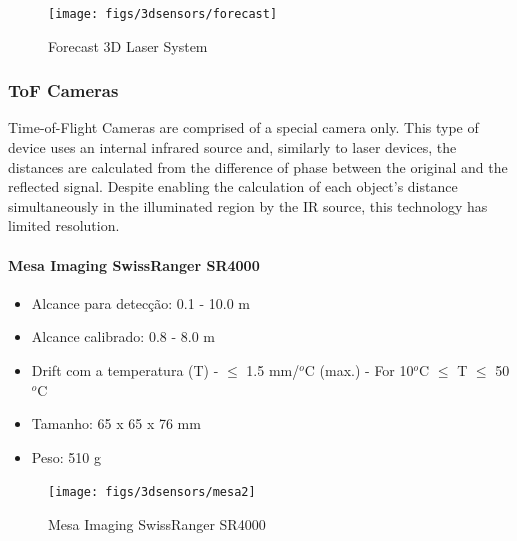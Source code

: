 \begin{figure}[h!]
   \centering
   \texttt{[image: figs/3dsensors/forecast]}
   \caption{Forecast 3D Laser System}
   \label{fig::forecast}
\end{figure}

\subsubsection{ToF Cameras}

Time-of-Flight Cameras are comprised of a special camera only. This type of
device uses an internal infrared source and, similarly to laser devices, the
distances are calculated from the difference of phase between the original and
the reflected signal.
Despite enabling the calculation of each object's distance simultaneously  in
the illuminated region by the IR source, this technology has limited resolution.


\paragraph{Mesa Imaging SwissRanger SR4000}


\begin{itemize}
  \item Alcance para detecção: 0.1 - 10.0 m
  \item Alcance calibrado: 0.8 - 8.0 m
  \item Drift com a temperatura (T) - $\leq$ 1.5 mm/$^o$C (max.) - For 10$^o$C
  $\leq$ T $\leq$ 50$^o$C
  \item Tamanho: 65 x 65 x 76 mm
  \item Peso: 510 g
\end{itemize}

\begin{figure}[h!]
   \centering
   \texttt{[image: figs/3dsensors/mesa2]}
   \caption{Mesa Imaging SwissRanger SR4000}
   \label{fig::mesa}
\end{figure}

